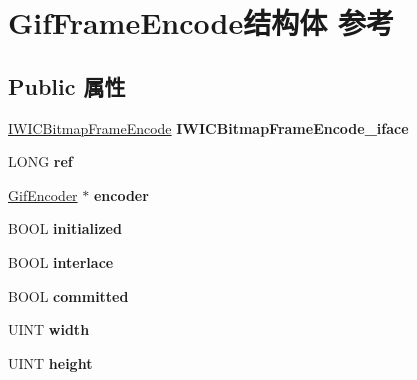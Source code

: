 \hypertarget{struct_gif_frame_encode}{}\section{Gif\+Frame\+Encode结构体 参考}
\label{struct_gif_frame_encode}
\subsection*{Public 属性}
\begin{DoxyCompactItemize}
\item 
\mbox{\label{struct_gif_frame_encode_a51a11fcf621bbbfa043dbcee36b4828e}} 
\hyperlink{interface_i_w_i_c_bitmap_frame_encode}{I\+W\+I\+C\+Bitmap\+Frame\+Encode} {\bfseries I\+W\+I\+C\+Bitmap\+Frame\+Encode\+\_\+iface}
\item 
\mbox{\label{struct_gif_frame_encode_a525cd8c893042bd5717f6f83392a0929}} 
L\+O\+NG {\bfseries ref}
\item 
\mbox{\label{struct_gif_frame_encode_a0922480737f5816c399ec6f6c6f8d006}} 
\hyperlink{struct_gif_encoder}{Gif\+Encoder} $\ast$ {\bfseries encoder}
\item 
\mbox{\label{struct_gif_frame_encode_a77e40e940bf4a72a32fe2d11bdd22290}} 
B\+O\+OL {\bfseries initialized}
\item 
\mbox{\label{struct_gif_frame_encode_a7bc4ece01a769e38f58556e205c0cbe0}} 
B\+O\+OL {\bfseries interlace}
\item 
\mbox{\label{struct_gif_frame_encode_ae01ed94937642743d660ffbfee4ad8a0}} 
B\+O\+OL {\bfseries committed}
\item 
\mbox{\label{struct_gif_frame_encode_a244a2740091a5551aac6e3988a4b9ec9}} 
U\+I\+NT {\bfseries width}
\item 
\mbox{\label{struct_gif_frame_encode_af4662afc02db0c5274338eb872785496}} 
U\+I\+NT {\bfseries height}
\item 
\mbox{\label{struct_gif_frame_encode_a14e17073a42e0ec6a652cda59fac6ca0}} 

\end{DoxyCompactItemize}
